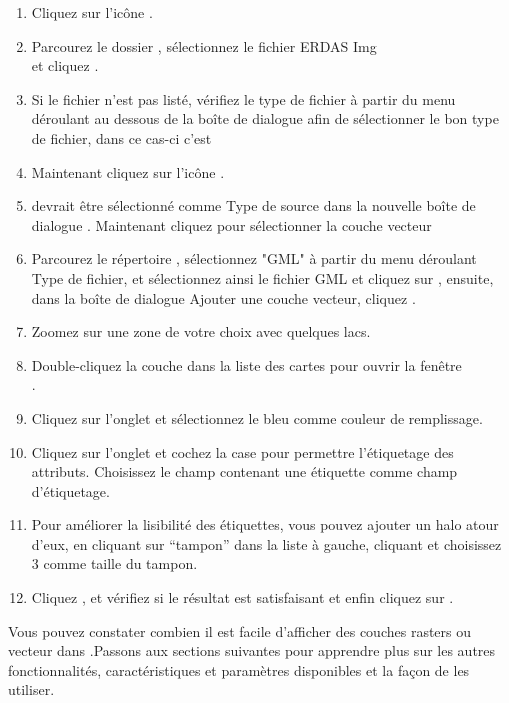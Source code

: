 {\setlength{\baselineskip}{1.3\baselineskip}
\begin{enumerate}[itemsep=2pt]
\item Cliquez sur l'icône .
\item Parcourez le dossier , sélectionnez 
le fichier ERDAS Img\\
  et cliquez .
\item Si le fichier n'est pas listé, vérifiez le type de fichier à partir du menu déroulant 
au dessous de la boîte de dialogue afin de sélectionner le bon type de fichier, dans ce cas-ci c'est 
\item Maintenant cliquez sur l'icône . 
\item {} devrait être sélectionné comme Type de source dans la nouvelle boîte de dialogue 
. Maintenant cliquez  pour sélectionner la couche vecteur
\item Parcourez le répertoire , sélectionnez "GML"
à partir du menu déroulant Type de fichier, et sélectionnez ainsi le fichier GML  
et cliquez sur , ensuite, dans la boîte de dialogue Ajouter une couche vecteur, cliquez .
\item Zoomez sur une zone de votre choix avec quelques lacs.
\item Double-cliquez la couche  dans la liste des cartes pour ouvrir la fenêtre\\ .
\item Cliquez sur l'onglet  et sélectionnez le bleu comme couleur de remplissage.
\item Cliquez sur l'onglet  et cochez la case  pour permettre l'étiquetage des attributs. 
Choisissez le champ contenant une étiquette comme champ d'étiquetage.
\item Pour améliorer la lisibilité des étiquettes, vous pouvez ajouter un halo atour d'eux,
en cliquant sur ``tampon'' dans la liste à gauche, cliquant  et choisissez 3 comme taille du tampon.
\item Cliquez , et vérifiez si le résultat est satisfaisant et enfin cliquez sur .
\end{enumerate} 
\par}
Vous pouvez constater combien il est facile d'afficher des couches rasters ou vecteur dans \qg.Passons aux sections suivantes pour apprendre plus sur les autres fonctionnalités, caractéristiques et paramètres disponibles et la façon de les utiliser.
